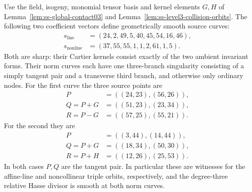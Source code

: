 \begin{lemma}
\label{lem:ss-global-tangent-triples}
Use the field, isogeny, monomial tensor basis and kernel elements $G,H$
of Lemma~\ref{lem:ss-global-contact03} and
Lemma~\ref{lem:ss-level3-collision-orbits}.
The following two coefficient vectors define geometrically smooth
source curves:
\[
 \begin{split}
 s_{\mathrm{line}}&=(24,2,49,5,40,45,54,16,46),\\
 s_{\mathrm{nonline}}&=(37,55,55,1,1,2,61,1,5).
 \end{split}
\]
Both are sharp: their Cartier kernels consist exactly of the two
ambient invariant forms. Their norm curves each have one three-branch
singularity consisting of a simply tangent pair and a transverse third
branch, and otherwise only ordinary nodes.
For the first curve the three source points are
\[
 \begin{split}
 P&=((24,23),(56,26)),\\
 Q=P+G&=((51,23),(23,34)),\\
 R=P-G&=((57,25),(55,21)).
 \end{split}
\]
For the second they are
\[
 \begin{split}
 P&=((3,44),(14,44)),\\
 Q=P+G&=((18,34),(50,30)),\\
 R=P+H&=((12,26),(25,53)).
 \end{split}
\]
In both cases $P,Q$ are the tangent pair. In particular these are
witnesses for the affine-line and noncollinear triple orbits,
respectively, and the degree-three relative Hasse divisor is smooth
at both norm curves.
\end{lemma}
